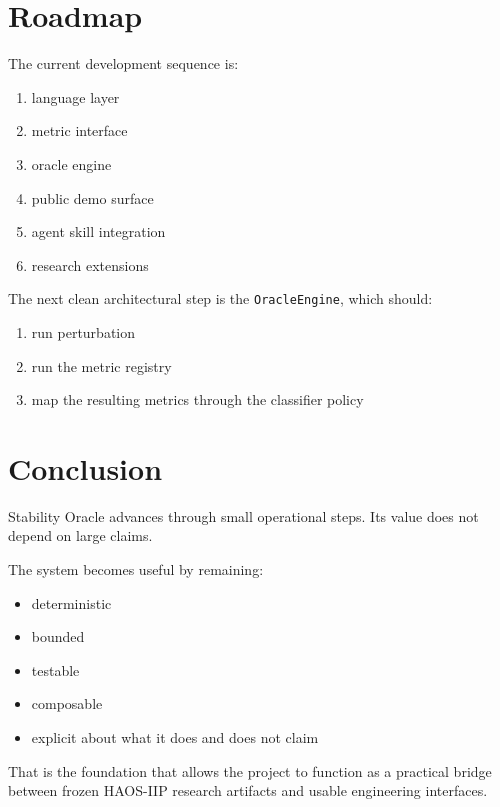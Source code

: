 \documentclass[11pt]{article}
\begin{document}
\section{Roadmap}

The current development sequence is:

\begin{enumerate}
\item language layer
\item metric interface
\item oracle engine
\item public demo surface
\item agent skill integration
\item research extensions
\end{enumerate}

The next clean architectural step is the \texttt{OracleEngine}, which should:

\begin{enumerate}
\item run perturbation
\item run the metric registry
\item map the resulting metrics through the classifier policy
\end{enumerate}

\section{Conclusion}

Stability Oracle advances through small operational steps.
Its value does not depend on large claims.

The system becomes useful by remaining:

\begin{itemize}
\item deterministic
\item bounded
\item testable
\item composable
\item explicit about what it does and does not claim
\end{itemize}

That is the foundation that allows the project to function as a practical bridge between frozen HAOS-IIP research artifacts and usable engineering interfaces.
\end{document}
